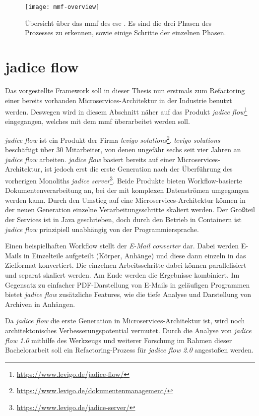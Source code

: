 \begin{figure}
	\centering
	\texttt{[image: mmf-overview]}
	\caption[\acrfull{mmf} Übersicht]{
		Übersicht über das \gls{mmf} des \gls{ese} \cite{fritzsch2022architecturecentric}. Es sind die drei Phasen des Prozesses zu erkennen, sowie einige Schritte der einzelnen Phasen.
	}
	\label{fig:mmf-overview}
\end{figure}

\section{jadice flow}

Das vorgestellte Framework soll in dieser Thesis nun erstmals zum Refactoring einer bereits vorhanden Microservices-Architektur in der Industrie benutzt werden.
Deswegen wird in diesem Abschnitt näher auf das Produkt \emph{jadice flow}\footnote{\url{https://www.levigo.de/jadice-flow/}} eingegangen, welches mit dem \gls{mmf} überarbeitet werden soll.

\emph{jadice flow} ist ein Produkt der Firma \emph{levigo solutions}\footnote{\url{https://www.levigo.de/dokumentenmanagement/}}.
\emph{levigo solutions} beschäftigt über 30 Mitarbeiter, von denen ungefähr sechs seit vier Jahren an \emph{jadice flow} arbeiten.
\emph{jadice flow} basiert bereits auf einer Microservices-Architektur, ist jedoch erst die erste Generation nach der Überführung des vorherigen Monoliths \emph{jadice server}\footnote{\url{https://www.levigo.de/jadice-server/}}.
Beide Produkte bieten Workflow-basierte Dokumentenverarbeitung an, bei der mit komplexen Datenströmen umgegangen werden kann.
Durch den Umstieg auf eine Microservices-Architektur können in der neuen Generation einzelne Verarbeitungsschritte skaliert werden.
Der Großteil der Services ist in Java geschrieben, doch durch den Betrieb in Containern ist \emph{jadice flow} prinzipiell unabhängig von der Programmiersprache.

Einen beispielhaften Workflow stellt der \emph{E-Mail converter} dar.
Dabei werden E-Mails in Einzelteile aufgeteilt (Körper, Anhänge) und diese dann einzeln in das Zielformat konvertiert.
Die einzelnen Arbeitsschritte dabei können parallelisiert und separat skaliert werden.
Am Ende werden die Ergebnisse kombiniert.
Im Gegensatz zu einfacher PDF-Darstellung von E-Mails in geläufigen Programmen bietet \emph{jadice flow} zusätzliche Features, wie die tiefe Analyse und Darstellung von Archiven in Anhängen.

Da \emph{jadice flow} die erste Generation in Microservices-Architektur ist, wird noch architektonisches Verbesserungspotential vermutet.
Durch die Analyse von \emph{jadice flow 1.0} mithilfe des Werkzeugs und weiterer Forschung im Rahmen dieser Bachelorarbeit soll ein Refactoring-Prozess für \emph{jadice flow 2.0} angestoßen werden.

